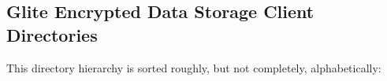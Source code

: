 \subsection{Glite Encrypted Data Storage Client Directories}
This directory hierarchy is sorted roughly, but not completely, alphabetically:\begin{CompactList}
\item {}
\begin{CompactList}
\item {}
\begin{CompactList}
\item {}
\begin{CompactList}
\item {}
\begin{CompactList}
\item {}
\end{CompactList}
\end{CompactList}
\end{CompactList}
\end{CompactList}
\end{CompactList}
